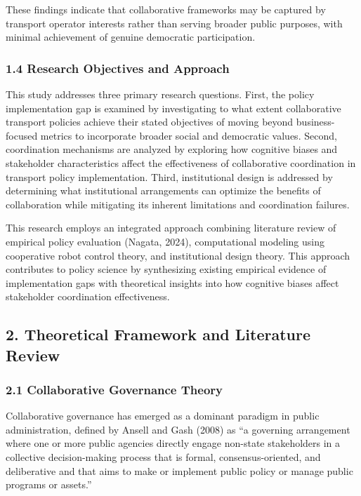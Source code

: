 These findings indicate that collaborative frameworks may be captured by
transport operator interests rather than serving broader public
purposes, with minimal achievement of genuine democratic participation.

\subsubsection{1.4 Research Objectives and
Approach}\label{research-objectives-and-approach}

This study addresses three primary research questions. First, the policy
implementation gap is examined by investigating to what extent
collaborative transport policies achieve their stated objectives of
moving beyond business-focused metrics to incorporate broader social and
democratic values. Second, coordination mechanisms are analyzed by
exploring how cognitive biases and stakeholder characteristics affect
the effectiveness of collaborative coordination in transport policy
implementation. Third, institutional design is addressed by determining
what institutional arrangements can optimize the benefits of
collaboration while mitigating its inherent limitations and coordination
failures.

This research employs an integrated approach combining literature review
of empirical policy evaluation (Nagata, 2024), computational modeling
using cooperative robot control theory, and institutional design theory.
This approach contributes to policy science by synthesizing existing
empirical evidence of implementation gaps with theoretical insights into
how cognitive biases affect stakeholder coordination effectiveness.

\subsection{2. Theoretical Framework and Literature
Review}\label{theoretical-framework-and-literature-review}

\subsubsection{2.1 Collaborative Governance
Theory}\label{collaborative-governance-theory}

Collaborative governance has emerged as a dominant paradigm in public
administration, defined by Ansell and Gash (2008) as ``a governing
arrangement where one or more public agencies directly engage non-state
stakeholders in a collective decision-making process that is formal,
consensus-oriented, and deliberative and that aims to make or implement
public policy or manage public programs or assets.''

